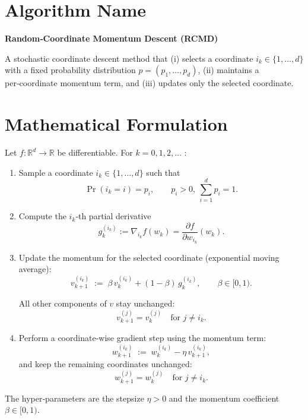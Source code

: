 \documentclass{article}
\newcommand{\R}{\mathbb{R}}
\begin{document}
\section*{Algorithm Name}
\textbf{Random‑Coordinate Momentum Descent (RCMD)}  

A stochastic coordinate descent method that (i) selects a coordinate $i_k\in\{1,\dots,d\}$ with a fixed probability distribution $p=(p_1,\dots ,p_d)$, (ii) maintains a per‑coordinate momentum term, and (iii) updates only the selected coordinate.

\section*{Mathematical Formulation}
Let $f:\R^{d}\rightarrow\R$ be differentiable.  
For $k=0,1,2,\dots$ :

\begin{enumerate}[label=\arabic*)]
\item Sample a coordinate $i_k\in\{1,\dots ,d\}$ such that 
\[
\Pr(i_k=i)=p_i,\qquad p_i>0,\ \sum_{i=1}^{d}p_i=1 .
\]

\item Compute the $i_k$‑th partial derivative 
\[
g_k^{(i_k)}:=\nabla_{i_k}f(w_k)=\frac{\partial f}{\partial w_{i_k}}(w_k).
\]

\item Update the momentum for the selected coordinate (exponential moving average):
\[
v_{k+1}^{(i_k)} \;:=\; \beta\,v_{k}^{(i_k)}+(1-\beta)\,g_k^{(i_k)},\qquad
\beta\in[0,1) .
\tag{1}
\]

All other components of $v$ stay unchanged:
\[
v_{k+1}^{(j)}=v_{k}^{(j)}\quad\text{for }j\neq i_k .
\]

\item Perform a coordinate‑wise gradient step using the momentum term:
\[
w_{k+1}^{(i_k)} \;:=\; w_{k}^{(i_k)}-\eta\,v_{k+1}^{(i_k)},
\tag{2}
\]
and keep the remaining coordinates unchanged:
\[
w_{k+1}^{(j)}=w_{k}^{(j)}\quad\text{for }j\neq i_k .
\]

\end{enumerate}
The hyper‑parameters are the stepsize $\eta>0$ and the momentum coefficient $\beta\in[0,1)$.
\end{document}
